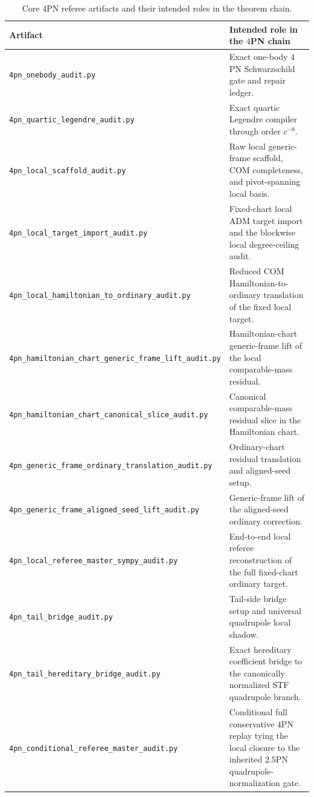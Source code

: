 \documentclass[11pt]{article}
\begin{document}
\begin{table}[H]
  \centering
  \caption{Core $4$PN referee artifacts and their intended roles in the theorem chain.}
  \label{tab:verification-4pn-artifacts}
  \small
  \renewcommand{\arraystretch}{1.15}
  \begin{tabularx}{\linewidth}{@{}L X@{}}
    \toprule
    Artifact & Intended role in the $4$PN chain \\
    \midrule
    \nolinkurl{4pn_onebody_audit.py} & Exact one-body $4$PN Schwarzschild gate and repair ledger. \\
    \nolinkurl{4pn_quartic_legendre_audit.py} & Exact quartic Legendre compiler through order $c^{-8}$. \\
    \nolinkurl{4pn_local_scaffold_audit.py} & Raw local generic-frame scaffold, COM completeness, and pivot-spanning local basis. \\
    \nolinkurl{4pn_local_target_import_audit.py} & Fixed-chart local ADM target import and the blockwise local degree-ceiling audit. \\
    \nolinkurl{4pn_local_hamiltonian_to_ordinary_audit.py} & Reduced COM Hamiltonian-to-ordinary translation of the fixed local target. \\
    \nolinkurl{4pn_hamiltonian_chart_generic_frame_lift_audit.py} & Hamiltonian-chart generic-frame lift of the local comparable-mass residual. \\
    \nolinkurl{4pn_hamiltonian_chart_canonical_slice_audit.py} & Canonical comparable-mass residual slice in the Hamiltonian chart. \\
    \nolinkurl{4pn_generic_frame_ordinary_translation_audit.py} & Ordinary-chart residual translation and aligned-seed setup. \\
    \nolinkurl{4pn_generic_frame_aligned_seed_lift_audit.py} & Generic-frame lift of the aligned-seed ordinary correction. \\
    \nolinkurl{4pn_local_referee_master_sympy_audit.py} & End-to-end local referee reconstruction of the full fixed-chart ordinary target. \\
    \nolinkurl{4pn_tail_bridge_audit.py} & Tail-side bridge setup and universal quadrupole local shadow. \\
    \nolinkurl{4pn_tail_hereditary_bridge_audit.py} & Exact hereditary coefficient bridge to the canonically normalized STF quadrupole branch. \\
    \nolinkurl{4pn_conditional_referee_master_audit.py} & Conditional full conservative $4$PN replay tying the local closure to the inherited $2.5$PN quadrupole-normalization gate. \\
    \bottomrule
  \end{tabularx}
\end{table}
\end{document}
